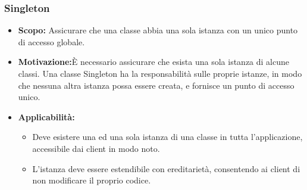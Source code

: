 \documentclass[a4paper]{article}
\begin{document}
	\subsubsection{Singleton}
		\begin{itemize}
			\item \textbf{Scopo:} Assicurare che una classe abbia una sola istanza con un unico punto di accesso globale.
			\item \textbf{Motivazione:}È necessario assicurare che esista una sola istanza di alcune classi. Una classe Singleton ha la responsabilità sulle proprie istanze, in modo che nessuna altra istanza possa essere creata, e fornisce un punto di accesso unico.
			\item \textbf{Applicabilità:}
			\begin{itemize}
				\item Deve esistere una ed una sola istanza di una classe in tutta l'applicazione, accessibile dai client in modo noto.
				\item L'istanza deve essere estendibile con ereditarietà, consentendo ai client di non modificare il proprio codice.
			\end{itemize}
		\end{itemize}
	
	\cleardoublepage
	\listoffigures
	
	\cleardoublepage
	\listoftables
		
\end{document}
